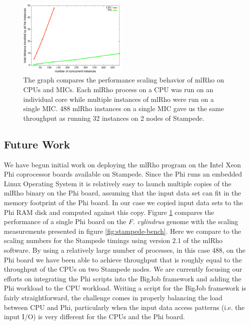 \documentclass{sig-alternate}
\begin{document}
\begin{figure} %
\centering
\includegraphics[width=0.48\textwidth]{figures/mic-scaling.pdf}
\caption{The graph compares the performance scaling behavior of mlRho on CPUs and MICs. Each mlRho process on a CPU was run on an individual core while multiple instances of mlRho were run on a single MIC. 488 mlRho instances on a single MIC gave us the same throughput as running 32 instances on 2 nodes of Stampede.  }
\label{fig:mic-scaling}
\end{figure}

\subsection{Future Work}
We have begun initial work on deploying the mlRho program on the Intel Xeon Phi coprocessor boards
available on Stampede. Since the Phi runs an embedded Linux Operating System \cite{xeon_phi}
it is relatively easy to launch multiple copies of the mlRho binary on the Phi board, assuming
that the input data set can fit in the memory footprint of the Phi board. In our case we copied input data
sets to the Phi RAM disk and computed against this copy. Figure \ref{fig:mic-scaling} compares the performance
of a single Phi board on the {\it F. cylindrus} genome with the scaling measurements presented in figure
\ref{fig:stampede-bench}. Here we compare to the scaling numbers for the Stampede timings using version 2.1 of
the mlRho software. By using a relatively large number of processes, in this case 488, on the Phi board
we have been able to achieve throughput that is roughly equal to the throughput of the CPUs on two Stampede
nodes. We are currently focusing our efforts on integrating the Phi scripts into the BigJob framework and
adding the Phi workload to the CPU workload. Writing a script for the BigJob framework is fairly
straightforward, the challenge comes in properly balancing the load between CPU and Phi, particularly when the
input data access patterns (i.e. the input I/O) is very different for the CPUs and the Phi board.
\end{document}

